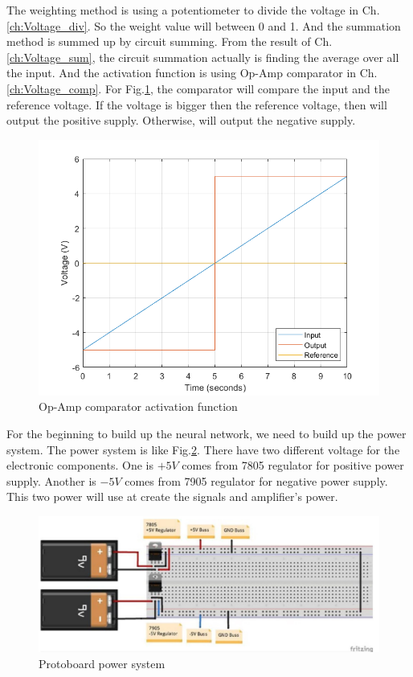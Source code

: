 \documentclass[a4paper, 12pt, AutoFakeBold]{report}
\newcommand{\figref}[1]{Fig.\ref{#1}}
\newcommand{\chref}[1]{Ch.\ref{#1}}
\begin{document}
    The weighting method is using a potentiometer to divide the voltage in \chref{ch:Voltage_div}. So the weight value will between 0 and 1. And the summation method is summed up by circuit summing. From the result of \chref{ch:Voltage_sum}, the circuit summation actually is finding the average over all the input. And the activation function is using Op-Amp comparator in \chref{ch:Voltage_comp}. For \figref{fig:Op_Amp}, the comparator will compare the input and the reference voltage. If the voltage is bigger then the reference voltage, then will output the positive supply. Otherwise, will output the negative supply.
    \begin{figure}[H]
        \centering
        \includegraphics[scale=.6]{figs/OpAmp.png}
        \caption{Op-Amp comparator activation function}
        \label{fig:Op_Amp}
    \end{figure}

    For the beginning to build up the neural network, we need to build up the power system. The power system is like \figref{fig:Power_onboard}. There have two different voltage for the electronic components. One is $+5V$ comes from 7805 regulator for positive power supply. Another is $-5V$ comes from 7905 regulator for negative power supply. This two power will use at create the signals and amplifier's power.
    \begin{figure}[H]
        \centering
        \includegraphics[scale=.4]{figs/Power_onboard.JPG}
        \caption{Protoboard power system}
        \label{fig:Power_onboard}
    \end{figure}
\end{document}
